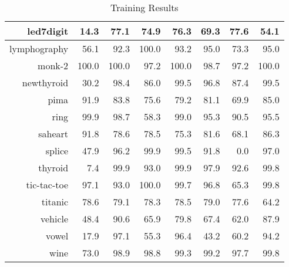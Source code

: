 \documentclass[a4paper,11pt]{article}
\begin{document}
\begin{table}[!htp]
\begin{tabular}{
|r|r|r|r|r|r|r|r|}
led7digit & 14.3 & 77.1 & 74.9 & 76.3 & 69.3 & 77.6 & 54.1\\
\hline
lymphography & 56.1 & 92.3 & 100.0 & 93.2 & 95.0 & 73.3 & 95.0\\
\hline
monk-2 & 100.0 & 100.0 & 97.2 & 100.0 & 98.7 & 97.2 & 100.0\\
\hline
newthyroid & 30.2 & 98.4 & 86.0 & 99.5 & 96.8 & 87.4 & 99.5\\
\hline
pima & 91.9 & 83.8 & 75.6 & 79.2 & 81.1 & 69.9 & 85.0\\
\hline
ring & 99.9 & 98.7 & 58.3 & 99.0 & 95.3 & 90.5 & 95.5\\
\hline
saheart & 91.8 & 78.6 & 78.5 & 75.3 & 81.6 & 68.1 & 86.3\\
\hline
splice & 47.9 & 96.2 & 99.9 & 99.5 & 91.8 & 0.0 & 97.0\\
\hline
thyroid & 7.4 & 99.9 & 93.0 & 99.9 & 97.9 & 92.6 & 99.8\\
\hline
tic-tac-toe & 97.1 & 93.0 & 100.0 & 99.7 & 96.8 & 65.3 & 99.8\\
\hline
titanic & 78.6 & 79.1 & 78.3 & 78.5 & 79.0 & 77.6 & 64.2\\
\hline
vehicle & 48.4 & 90.6 & 65.9 & 79.8 & 67.4 & 62.0 & 87.9\\
\hline
vowel & 17.9 & 97.1 & 55.3 & 96.4 & 43.2 & 60.2 & 94.2\\
\hline
wine & 73.0 & 98.9 & 98.8 & 99.3 & 99.2 & 97.7 & 99.8\\
\hline

\end{tabular}
\caption{Training Results}
\end{table}

\newpage
\end{document}
